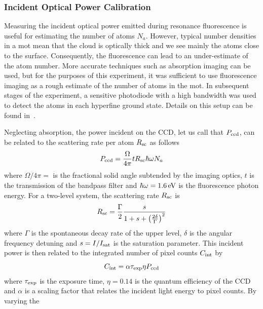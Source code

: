 \subsubsection{Incident Optical Power Calibration} 
Measuring the incident optical power emitted
during resonance fluorescence is useful for estimating the
number of atoms \(N_a\). However, typical number densities in a
\ac{mot} mean that the cloud is optically thick and we see mainly 
the atoms close to the surface. Consequently, the fluorescence can
lead to an under-estimate of the atom number. More accurate techniques such as
absorption imaging can be used, but for the purposes of this
experiment, it was
sufficient to use fluorescence imaging as a rough estimate of the
number of atoms in the \ac{mot}. In subsequent stages of the
experiment, a sensitive photodiode with a high bandwidth was used to
detect the atoms in each hyperfine ground state. Details on this setup
can
be found in~. \par\noindent
Neglecting absorption, the power incident on the CCD, let us call that
\(P_\textnormal{ccd}\), can be related to the scattering rate per atom
$R_\textnormal{sc}$ as follows
\begin{equation}
	P_\textnormal{ccd} = \frac{\Omega}{4\pi} t R_\textnormal{sc}  \hbar \omega N_a
\end{equation}
where $\Omega/4\pi = $ is the fractional solid angle subtended by
the imaging optics, \(t\) is the transmission of the bandpass filter
and 
\(\hbar \omega =
\sivalue{1.6}{\electronvolt}\) is the fluorescence photon energy. For a
two-level system, the scattering rate $R_\textnormal{sc}$ is 
\begin{equation}
  \label{eq:scattering_rate}
  R_\textnormal{sc} = \frac{\Gamma}{2} \frac{s}{1+s+\left(\frac{2
  \delta}{\Gamma}\right)^2}
\end{equation}
where $\Gamma$ is the spontaneous decay rate of the upper level, $\delta$ is
the angular frequency detuning and $s = I/I_\textnormal{sat}$ is the
saturation parameter. This incident power
is then related to the integrated number of pixel counts \(C_\textnormal{int}\)
by
\begin{equation}
	C_\textnormal{int} = \alpha \tau_\textnormal{exp} \eta P_\textnormal{ccd}
\end{equation}
where \(\tau_\textnormal{exp}\) is the exposure time, \(\eta = 0.14\) is the
quantum efficiency of the CCD and \(\alpha\) is a scaling factor that relates
the incident light energy to pixel counts. By varying the
